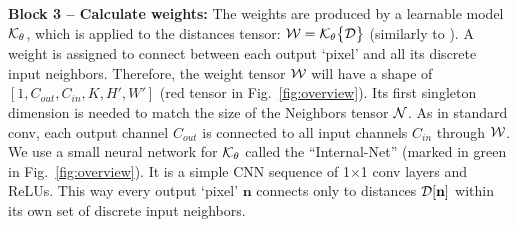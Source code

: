 \textbf{Block 3 -- Calculate weights:} The weights are produced by a learnable model $\textcolor{black}{\mathcal{K}_\theta}$, which is applied to the distances tensor:
$\textcolor{black}{\mathcal{W} = \mathcal{K}_\theta \big\{ \mathcal{D}\big\}}$ (similarly to \cite{wang2018deep}).
A weight is assigned to connect between each output `pixel' and all its discrete input neighbors. Therefore, the weight tensor $\textcolor{black}{\mathcal{W}}$ will have a shape of $[1,C_{out},C_{in},K,H',W']$ 
(red tensor in Fig.~\ref{fig:overview}). 
Its first singleton dimension is needed to match the size of the Neighbors tensor $\textcolor{black}{\mathcal{N}}$. As in standard conv, each output channel  $C_{out}$ is connected to all input channels $C_{in}$ through $\textcolor{black}{\mathcal{W}}$. We use a small neural network for $\textcolor{black}{\mathcal{K}_\theta}$ called the ``Internal-Net'' (marked in green in Fig.~\ref{fig:overview}). It is a simple CNN sequence of 1$\times$1 conv layers and ReLUs. This way every output `pixel' $\textbf{n}$ connects only to distances $\textcolor{black}{\mathcal{D}[\textbf{n}]}$ within its own set of discrete input neighbors. 


